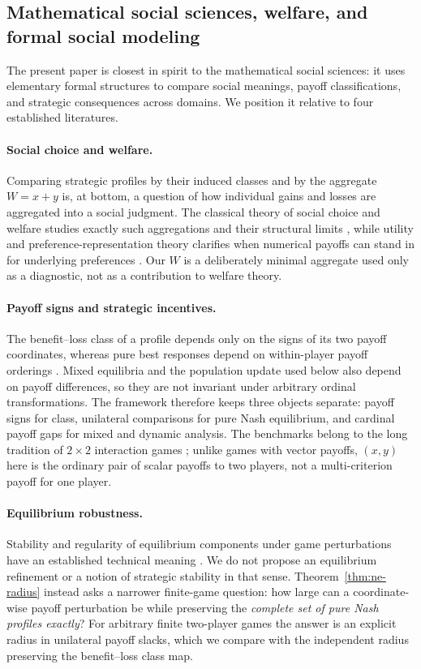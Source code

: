 \documentclass[a4paper,fleqn]{cas-dc}
\theoremstyle{remark}
\begin{document}
\subsection{Mathematical social sciences, welfare, and formal social modeling}

The present paper is closest in spirit to the mathematical social sciences: it uses elementary formal structures to compare social meanings, payoff classifications, and strategic consequences across domains. We position it relative to four established literatures.

\paragraph{Social choice and welfare.} Comparing strategic profiles by their induced classes and by the aggregate $W=x+y$ is, at bottom, a question of how individual gains and losses are aggregated into a social judgment. The classical theory of social choice and welfare studies exactly such aggregations and their structural limits \citep{Arrow1951,Sen1970}, while utility and preference-representation theory clarifies when numerical payoffs can stand in for underlying preferences \citep{Fishburn1970}. Our $W$ is a deliberately minimal aggregate used only as a diagnostic, not as a contribution to welfare theory.

\paragraph{Payoff signs and strategic incentives.} The benefit--loss class of a profile depends only on the signs of its two payoff coordinates, whereas pure best responses depend on within-player payoff orderings \citep{vonNeumann1944,OsborneRubinstein1994}. Mixed equilibria and the population update used below also depend on payoff differences, so they are not invariant under arbitrary ordinal transformations. The framework therefore keeps three objects separate: payoff signs for class, unilateral comparisons for pure Nash equilibrium, and cardinal payoff gaps for mixed and dynamic analysis. The benchmarks belong to the long tradition of $2\times2$ interaction games \citep{Rapoport1965}; unlike games with vector payoffs, $(x,y)$ here is the ordinary pair of scalar payoffs to two players, not a multi-criterion payoff for one player.

\paragraph{Equilibrium robustness.} Stability and regularity of equilibrium components under game perturbations have an established technical meaning \citep{Jansen1981,KohlbergMertens1986}. We do not propose an equilibrium refinement or a notion of strategic stability in that sense. Theorem~\ref{thm:ne-radius} instead asks a narrower finite-game question: how large can a coordinate-wise payoff perturbation be while preserving the \emph{complete set of pure Nash profiles exactly}? For arbitrary finite two-player games the answer is an explicit radius in unilateral payoff slacks, which we compare with the independent radius preserving the benefit--loss class map.
\end{document}
